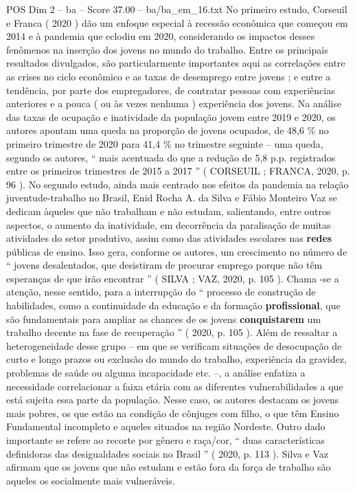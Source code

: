 \begin{textsample}{POS Dim 2 – ba – Score 37.00 – ba/ba\_em\_16.txt}
No primeiro estudo, Corseuil e Franca ( 2020 ) dão um enfoque especial à recessão econômica que começou em 2014 e à pandemia que eclodiu em 2020, considerando os impactos desses fenômenos na inserção dos jovens no mundo do trabalho.
Entre os principais resultados divulgados, são particularmente importantes aqui as correlações entre as crises no ciclo econômico e as taxas de desemprego entre jovens ; e entre a tendência, por parte dos empregadores, de contratar pessoas com experiências anteriores e a pouca ( ou às vezes nenhuma ) experiência dos jovens.
Na análise das taxas de ocupação e inatividade da população jovem entre 2019 e 2020, os autores apontam uma queda na proporção de jovens ocupados, de 48,6 \% no primeiro trimestre de 2020 para 41,4 \% no trimestre seguinte – uma queda, segundo os autores, “ mais acentuada do que a redução de 5,8 p.p. registrados entre os primeiros trimestres de 2015 a 2017 ” ( CORSEUIL ; FRANCA, 2020, p. 96 ).
No segundo estudo, ainda mais centrado nos efeitos da pandemia na relação juventude-trabalho no Brasil, Enid Rocha A. da Silva e Fábio Monteiro Vaz se dedicam àqueles que não trabalham e não estudam, salientando, entre outros aspectos, o aumento da inatividade, em decorrência da paralisação de muitas atividades do setor produtivo, assim como das atividades escolares nas \textbf{redes} públicas de ensino.
Isso gera, conforme os autores, um crescimento no número de “ jovens desalentados, que desistiram de procurar emprego porque não têm esperanças de que irão encontrar ” ( SILVA ; VAZ, 2020, p. 105 ).
Chama -se a atenção, nesse sentido, para a interrupção do “ processo de construção de habilidades, como a continuidade da educação e da formação \textbf{profissional}, que são fundamentais para ampliar as chances de os jovens \textbf{conquistarem} um trabalho decente na fase de recuperação ” ( 2020, p. 105 ).
Além de ressaltar a heterogeneidade desse grupo – em que se verificam situações de desocupação de curto e longo prazos ou exclusão do mundo do trabalho, experiência da gravidez, problemas de saúde ou alguma incapacidade etc. –, a análise enfatiza a necessidade correlacionar a faixa etária com as diferentes vulnerabilidades a que está sujeita essa parte da população.
Nesse caso, os autores destacam os jovens mais pobres, os que estão na condição de cônjuges com filho, o que têm Ensino Fundamental incompleto e aqueles situados na região Nordeste.
Outro dado importante se refere ao recorte por gênero e raça/cor, “ duas características definidoras das desigualdades sociais no Brasil ” ( 2020, p. 113 ).
Silva e Vaz afirmam que os jovens que não estudam e estão fora da força de trabalho são aqueles os socialmente mais vulneráveis.

\end{textsample}
